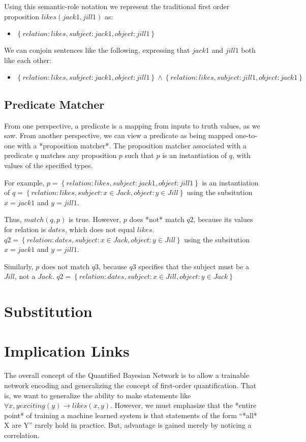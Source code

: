 \documentclass[12pt]{article}
\begin{document}
Using this semantic-role notation we represent the traditional first order proposition $likes(jack1, jill1)$ as:
\begin{itemize}
    \item $\left\{relation:likes, subject:jack1, object:jill1 \right\}$
\end{itemize}

We can conjoin sentences like the following, expressing that $jack1$ and $jill1$ both like each other:
\begin{itemize}
    \item $\left\{relation:likes, subject:jack1, object:jill1 \right\} \wedge \left\{relation:likes, subject:jill1, object:jack1 \right\}$
\end{itemize}

\subsection{Predicate Matcher}
From one perspective, a predicate is a mapping from inputs to truth values, as we saw.
From another perspective, we can view a predicate as being mapped one-to-one with a *proposition matcher*.
The proposition matcher associated with a predicate $q$ matches any proposition $p$ such that $p$ is an instantiation of $q$, with values of the specified types.

For example, 
$p = \left\{relation:likes, subject:jack1, object:jill1 \right\}$
is an instantiation of
$q = \left\{relation:likes, subject:{x \in Jack}, object:{y \in Jill} \right\}$
using the subsitution $x=jack1$ and $y=jill1$.

Thus, $match(q, p)$ is true.
However, $p$ does *not* match $q2$, because its values for relation is $dates$, which does not equal $likes$.
$q2 = \left\{relation:dates, subject:{x \in Jack}, object:{y \in Jill} \right\}$
using the subsitution $x=jack1$ and $y=jill1$.

Similarly, $p$ does not match $q3$, because $q3$ specifies that the subject must be a $Jill$, not a $Jack$.
$q2 = \left\{relation:dates, subject:{x \in Jill}, object:{y \in Jack} \right\}$

\section{Substitution}
\section{Implication Links}
The overall concept of the Quantified Bayesian Network is to allow a trainable network encoding and generalizing the concept of first-order quantification.
That is, we want to generalize the ability to make statements like $\forall x, y exciting(y) \rightarrow likes(x, y)$.
However, we must emphasize that the *entire point* of training a machine learned system is that statements of the form ``*all* X are Y'' rarely hold in practice.
But, advantage is gained merely by noticing a correlation.
\end{document}

